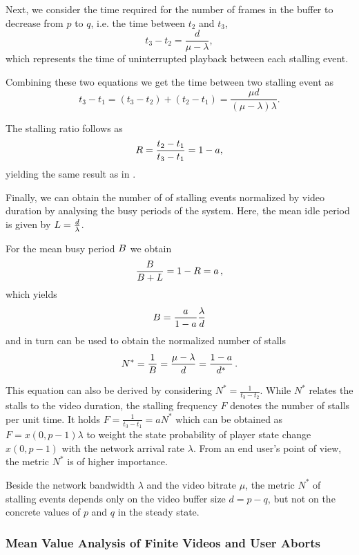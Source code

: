 Next, we consider the time required for the number of frames in the buffer to decrease from \(p\) 
to \(q\), i.e. the time between \(t_2\) and \(t_3\), 
\[t_3-t_2 = \frac{d}{\mu-\lambda},\]
which represents the time of uninterrupted playback between each stalling event.

Combining these two equations we get the time between two stalling event as
\[
t_3-t_1=(t_3-t_2)+(t_2-t_1)=\frac{\mu d}{(\mu-\lambda)\lambda}.
\]

The stalling ratio \stallingRatio follows as
\begin{equation}
R = \frac{t_2-t_1}{t_3-t_1} = 1-a,
\label{eq:application:qoe_user_behaviour:system_model:steady_state:stalling_ratio}
\end{equation}
yielding the same result as in .

Finally, we can obtain the number of of stalling events normalized by video duration by analysing the busy periods of the system.
Here, the mean idle period is given by \(L = \frac{d}{\lambda}\).

For the mean busy period \(B\) we obtain
\[
\frac{B}{B + L} = 1 - R = a \, ,
\]
which yields
\[
B = \frac{a}{1-a}\frac{\lambda}{d} 
\]
and in turn can be used to obtain the normalized number of stalls 
\begin{equation}
N^* = \frac{1}{B}=\frac{\mu-\lambda}{d} = \frac{1-a}{d^*}\, .
\label{eq:application:qoe_user_behaviour:system_model:steady_state:normalized_number_of_stalls}
\end{equation}

This equation can also be derived by considering \(N^*=\frac{1}{t_3-t_2}\). 
While \(N^*\) relates the stalls to the video duration, the stalling frequency \(F\) denotes the number of stalls per unit time. 
It holds \(F=\frac{1}{t_3-t_1}=a N^*\) which can be obtained as \(F=x(0,p-1) \lambda\) to weight the state probability of player state change \(x(0,p-1)\) with the network arrival rate \(\lambda\). 
From an end user's point of view, the metric $N^*$ is of higher importance. 

Beside the network bandwidth \(\lambda\) and the video bitrate \(\mu\), the metric \(N^*\) of stalling events depends only on the video buffer size \(d=p-q\), but not on the concrete values of \(p\) and \(q\) in the steady state.


\subsubsection*{Mean Value Analysis of Finite Videos and User Aborts}\label{sec:application:qoe_user_behaviour:system_model:finite_video}


